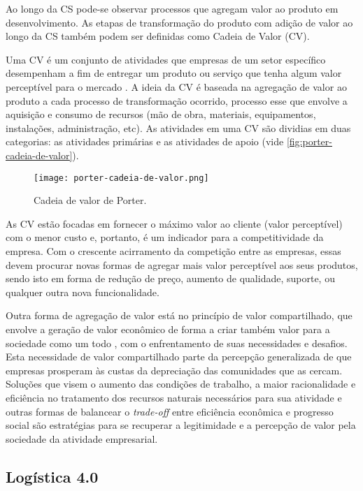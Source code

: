 Ao longo da CS pode-se observar processos que agregam valor ao produto em desenvolvimento. As etapas de transformação do produto com adição de valor ao longo da CS também podem ser definidas como Cadeia de Valor (CV).

Uma CV é um conjunto de atividades que empresas de um setor específico desempenham a fim de entregar um produto ou serviço que tenha algum valor perceptível para o mercado \cite{porter1985competitiveadvantage}. A ideia da CV é baseada na agregação de valor ao produto a cada processo de transformação ocorrido, processo esse que envolve a aquisição e consumo de recursos (mão de obra, materiais, equipamentos, instalações, administração, etc). As atividades em uma CV são dividias em duas categorias: as atividades primárias e as atividades de apoio \cite{porter1985competitiveadvantage} (vide \autoref{fig:porter-cadeia-de-valor}).

\begin{figure}[t]
	\centering
	\texttt{[image: porter-cadeia-de-valor.png]}
	\caption{Cadeia de valor de Porter.}
	\label{fig:porter-cadeia-de-valor}
\end{figure}

As CV estão focadas em fornecer o máximo valor ao cliente (valor perceptível) com o menor custo e, portanto, é um indicador para a competitividade da empresa. Com o crescente acirramento da competição entre as empresas, essas devem procurar novas formas de agregar mais valor perceptível aos seus produtos, sendo isto em forma de redução de preço, aumento de qualidade, suporte, ou qualquer outra nova funcionalidade.

Outra forma de agregação de valor está no princípio de valor compartilhado, que envolve a geração de valor econômico de forma a criar também valor para a sociedade como um todo \cite{porter2011valorcompartilhado}, com o enfrentamento de suas necessidades e desafios. Esta necessidade de valor compartilhado parte da percepção generalizada de que empresas prosperam às custas da depreciação das comunidades que as cercam. Soluções que visem o aumento das condições de trabalho, a maior racionalidade e eficiência no tratamento dos recursos naturais necessários para sua atividade e outras formas de balancear o \textit{trade-off} entre eficiência econômica e progresso social são estratégias para se recuperar a legitimidade e a percepção de valor pela sociedade da atividade empresarial.

\subsection{Logística 4.0}

